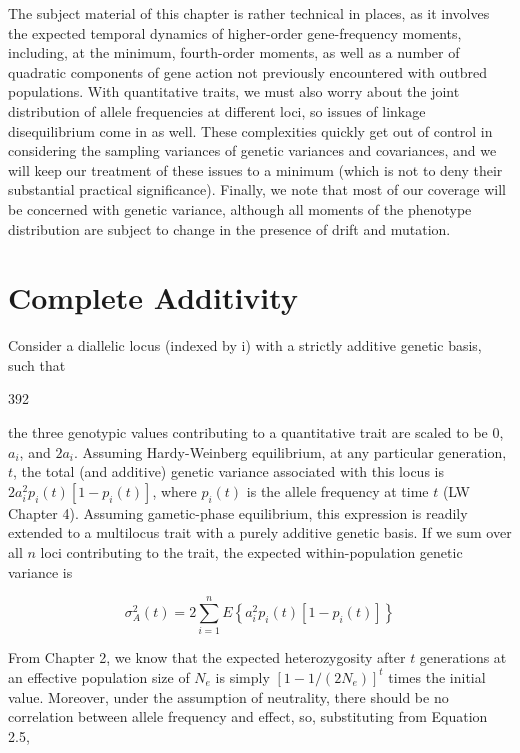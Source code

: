 \documentclass{article}
\begin{document}
The subject material of this chapter is rather technical in places, as it involves the expected temporal dynamics of higher-order gene-frequency moments, including, at the minimum, fourth-order moments, as well as a number of quadratic components of gene action not previously encountered with outbred populations. With quantitative traits, we must also worry about the joint distribution of allele frequencies at different loci, so issues of linkage disequilibrium come in as well. These complexities quickly get out of control in considering the sampling variances of genetic variances and covariances, and we will keep our treatment of these issues to a minimum (which is not to deny their substantial practical significance). Finally, we note that most of our coverage will be concerned with genetic variance, although all moments of the phenotype distribution are subject to change in the presence of drift and mutation.

\section{Complete Additivity}
Consider a diallelic locus (indexed by i) with a strictly additive genetic basis, such that

392

the three genotypic values contributing to a quantitative trait are scaled to be 0,  $ a_i $, and  $ 2a_i $. Assuming Hardy-Weinberg equilibrium, at any particular generation,  $ t $, the total (and additive) genetic variance associated with this locus is  $ 2a_i^2p_i(t)[1 - p_i(t)] $, where  $ p_i(t) $ is the allele frequency at time  $ t $ (LW Chapter 4). Assuming gametic-phase equilibrium, this expression is readily extended to a multilocus trait with a purely additive genetic basis. If we sum over all  $ n $ loci contributing to the trait, the expected within-population genetic variance is

\begin{equation}
\sigma_{A}^{2}(t)=2\sum_{i=1}^{n}E\left\{a_{i}^{2}p_{i}(t)[1-p_{i}(t)]\right\}
\tag{11.1}
\label{eq:11_1}
\end{equation}

From Chapter 2, we know that the expected heterozygosity after  $ t $ generations at an effective population size of  $ N_e $ is simply  $ [1 - 1/(2N_e)]^t $ times the initial value. Moreover, under the assumption of neutrality, there should be no correlation between allele frequency and effect, so, substituting from Equation 2.5,
\end{document}
